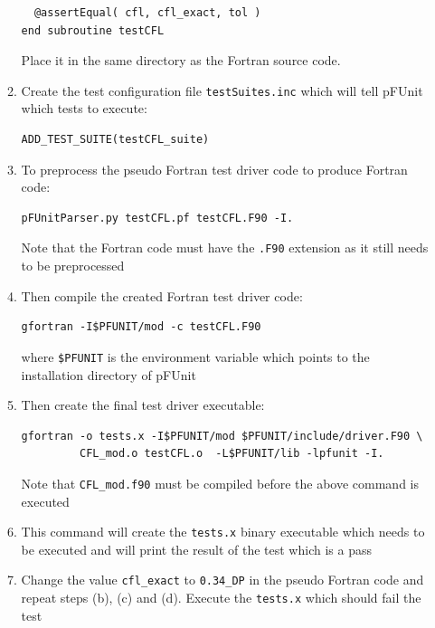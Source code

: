 \documentclass[12pt]{article}
\begin{document}
\begin{enumerate}
\begin{enumerate}
\begin{verbatim}
  @assertEqual( cfl, cfl_exact, tol )
end subroutine testCFL
\end{verbatim}
Place it in the same directory as the Fortran source code.
\item Create the test configuration file \texttt{testSuites.inc} which will tell pFUnit which tests to execute:
\begin{verbatim}
ADD_TEST_SUITE(testCFL_suite)
\end{verbatim}
\item To preprocess the pseudo Fortran test driver code to produce Fortran code:
\begin{verbatim}
pFUnitParser.py testCFL.pf testCFL.F90 -I.
\end{verbatim}
Note that the Fortran code must have the \texttt{.F90} extension as it still needs to be preprocessed
\item Then compile the created Fortran test driver code:
\begin{verbatim}
gfortran -I$PFUNIT/mod -c testCFL.F90
\end{verbatim}
where \texttt{\$PFUNIT} is the environment variable which points to the installation directory of pFUnit
\item Then create the final test driver executable:
\begin{verbatim}
gfortran -o tests.x -I$PFUNIT/mod $PFUNIT/include/driver.F90 \
         CFL_mod.o testCFL.o  -L$PFUNIT/lib -lpfunit -I.
\end{verbatim}
Note that \texttt{CFL\_mod.f90} must be compiled before the above command is executed
\item This command will create the \texttt{tests.x} binary executable which needs to be executed
and will print the result of the test which is a pass
\item Change the value \texttt{cfl\_exact} to \texttt{0.34\_DP} in the pseudo Fortran code and repeat
steps (b), (c) and (d). Execute the \texttt{tests.x} which should fail the test
\end{enumerate}
\end{enumerate}
\end{document}
